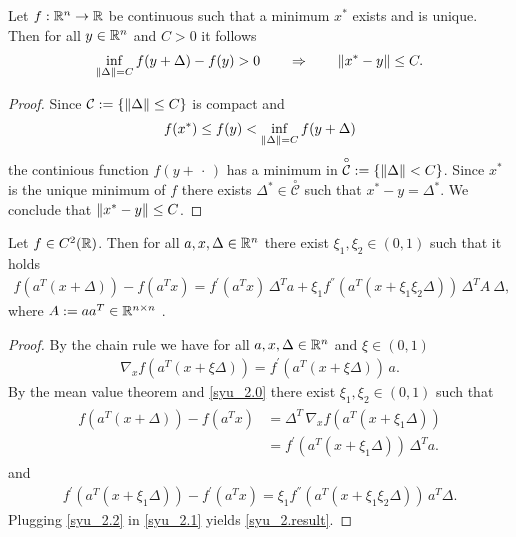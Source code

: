 \begin{proposition}
  Let 
  $f : \mathbb{R}^n \to \mathbb{R}$ 
  be continuous such that 
  a minimum $x^*$ exists and is unique.
  Then 
  for all $y \in \mathbb{R}^n$ and $C>0$ 
  it follows
    \begin{gather}
      \inf_{\left\lVert\Delta\right\rVert=C} f(y+\Delta) - f(y) > 0 \qquad
      \Rightarrow \qquad 
      \left\lVert x^* - y\right\rVert \le C.
    \end{gather}
\end{proposition}


\begin{proof}
Since 
$\mathcal{C}:=\left\{ \left\lVert\Delta\right\rVert\le C \right\}$
is compact and
\begin{gather*}
  f(x^*) \le f(y) <  \inf_{\left\lVert\Delta\right\rVert=C} f(y+\Delta)
\end{gather*}
the continious function $f(y+\,\cdot\,)$ has a minimum in 
$\overset{\circ}{\mathcal{C}}:=\left\{ \left\lVert\Delta\right\rVert < C \right\}$. 
Since 
$x^*$ is the unique minimum of $f$
there exists $\Delta^* \in \overset{\circ}{\mathcal{C}}$ 
such that 
$x^* - y = \Delta^*$.
We conclude that
$\left\lVert x^* - y\right\rVert \le C$.
\end{proof}


\begin{proposition}
  Let 
  $f\in C^2(\mathbb{R})$. 
  Then
  for all $a,x,\Delta \in \mathbb{R}^n$ 
  there exist $\xi_1, \xi_2 \in (0,1)$ 
  such that it holds
  \begin{gather}
    \label{syu_2.result}
    f(a^T (x + \Delta)) - f(a^T x) = 
    f^{'}(a^T x)\, \Delta^T a + 
    \xi_1 f^{''}(a^T (x + \xi_1\xi_2 \Delta))\, \Delta^T A\ \Delta,
  \end{gather}
  where 
  $A:= a a^T \in \mathbb{R}^{n \times n}$ .
\end{proposition}

\begin{proof}
  By the chain rule 
  we have
  for all $a, x, \Delta \in \mathbb{R}^n$ and $\xi \in (0,1)$
  \begin{gather}
    \label{syu_2.0}
    \nabla_x f(a^T (x + \xi \Delta)) =
    f^{'}(a^T (x + \xi \Delta))\, a.
  \end{gather}
  By 
  the mean value theorem and \eqref{syu_2.0}
  there exist $\xi_1, \xi_2 \in (0,1)$
  such that
  \begin{align}
    \label{syu_2.1}
    \begin{split}
    f(a^T (x + \Delta)) - f(a^T x)
    &= 
    \Delta^T\, \nabla_x f(a^T (x + \xi_1 \Delta)) \\ 
    &=
    f^{'}(a^T (x + \xi_1 \Delta))\, \Delta^T a.
    \end{split}
  \end{align}
  and
  \begin{gather}
    \label{syu_2.2}
    f^{'}(a^T (x + \xi_1 \Delta)) - f^{'}(a^T x)
    =
    \xi_1 f^{''}(a^T (x + \xi_1 \xi_2 \Delta))\, a^T \Delta.
  \end{gather}
  Plugging \eqref{syu_2.2} in \eqref{syu_2.1} 
  yields
  \eqref{syu_2.result}.
\end{proof}

